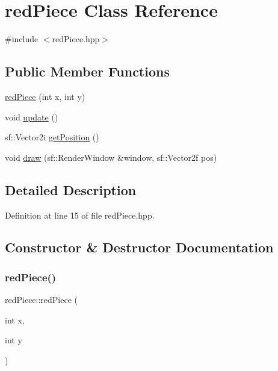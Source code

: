 \hypertarget{classred_piece}{}\section{red\+Piece Class Reference}
\label{classred_piece}


{\ttfamily \#include $<$red\+Piece.\+hpp$>$}

\subsection*{Public Member Functions}
\begin{DoxyCompactItemize}
\item 
\mbox{\hyperlink{classred_piece_aae46ee8100cc5bbb23aeae17196c159e}{red\+Piece}} (int x, int y)
\item 
void \mbox{\hyperlink{classred_piece_a90dbfbe8e12b0495e9ff01819b89b5d2}{update}} ()
\item 
sf\+::\+Vector2i \mbox{\hyperlink{classred_piece_a1a707e1a60df9654c3158f97eaf0a22b}{get\+Position}} ()
\item 
void \mbox{\hyperlink{classred_piece_ad8150c1fd0b92e8e5e2a1e6261a78db1}{draw}} (sf\+::\+Render\+Window \&window, sf\+::\+Vector2f pos)
\end{DoxyCompactItemize}


\subsection{Detailed Description}


Definition at line 15 of file red\+Piece.\+hpp.



\subsection{Constructor \& Destructor Documentation}
\mbox{\label{classred_piece_aae46ee8100cc5bbb23aeae17196c159e}} 
\subsubsection{\texorpdfstring{redPiece()}{redPiece()}}
{\footnotesize\ttfamily red\+Piece\+::red\+Piece (\begin{DoxyParamCaption}\item[{int}]{x,  }\item[{int}]{y }\end{DoxyParamCaption})}

